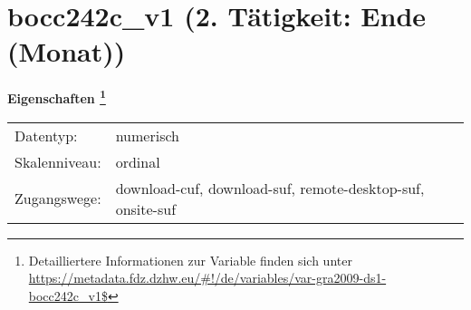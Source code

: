
    \setcounter{footnote}{0}

    \vspace*{-1.8cm}
	\section{bocc242c\_v1 (2. Tätigkeit: Ende (Monat))}
	\label{section:bocc242c_v1}



    \vspace*{0.5cm}
    \noindent\textbf{Eigenschaften
	\footnote{Detailliertere Informationen zur Variable finden sich unter
		\url{https://metadata.fdz.dzhw.eu/\#!/de/variables/var-gra2009-ds1-bocc242c_v1$}}}\\
	\begin{tabularx}{\hsize}{@{}lX}
	Datentyp: & numerisch \\
	Skalenniveau: & ordinal \\
	Zugangswege: &
	  download-cuf, 
	  download-suf, 
	  remote-desktop-suf, 
	  onsite-suf
 \\
    \end{tabularx}



